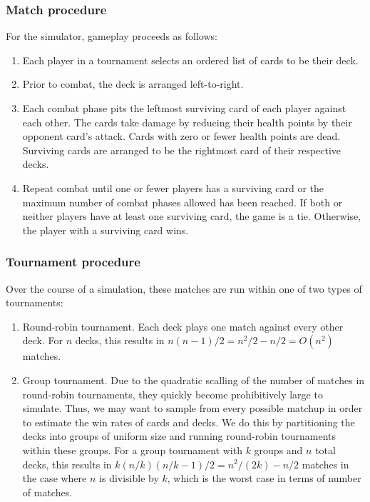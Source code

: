 \subsubsection{Match procedure} \label{sec:game}

For the simulator, gameplay proceeds as follows:

\begin{enumerate}
	\item Each player in a tournament selects an ordered list
	of cards to be their deck.
	\item Prior to combat, the deck is arranged left-to-right.
	\item Each combat phase pits the leftmost surviving card
	of each player against each other. The cards take damage by 
	reducing their health points by their opponent card's attack.
	Cards with zero or fewer health points are dead. Surviving cards
	are arranged to be the rightmost card of their respective decks.
	\item Repeat combat until one or fewer players has a surviving card
	or the maximum number of combat phases allowed has been reached.
	If both or neither players have at least one surviving card, the game is a tie.
	Otherwise, the player with a surviving card wins.
\end{enumerate}

\subsubsection{Tournament procedure} \label{sec:tourney}

Over the course of a simulation, these matches are run within one of two types of tournaments:

\begin{enumerate}
	\item Round-robin tournament. Each deck plays one match against every other deck.
	For $n$ decks, this results in $n(n-1)/2 = n^2/2 - n/2 = O(n^2)$ matches.
	\item Group tournament. Due to the quadratic scalling of the number of matches in round-robin
	tournaments, they quickly become prohibitively large to simulate. Thus, we may want to sample from every possible 
	matchup in order to estimate the win rates of cards and decks. We do this by 
	partitioning the decks into groups of uniform size and running round-robin tournaments within these groups.
	For a group tournament with $k$ groups and $n$ total decks, this results in $k(n/k)(n/k - 1)/2 = n^2/(2k) - n/2$ matches in the case where 
	$n$ is divisible by $k$, which is the worst case in terms of number of matches.
\end{enumerate}


